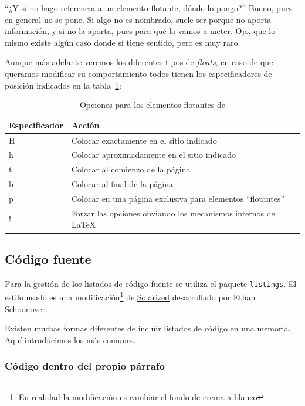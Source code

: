 \documentclass[%
    school=etsisi,%
    type=pfg,%
    degree=61CI,%
]{upm-report}
\begin{document}
\enquote{¿Y si no hago referencia a un elemento flotante, dónde lo pongo?} Bueno, pues en general no se pone. Si algo no es nombrado, suele ser porque no aporta información, y si no la aporta, pues para qué lo vamos a meter. Ojo, que lo mismo existe algún caso donde sí tiene sentido, pero es muy raro.

Aunque más adelante veremos los diferentes tipos de \textit{floats}, en caso de que queramos modificar su comportamiento todos tienen los especificadores de posición indicados en la tabla~\ref{tab:floats-options}:

\begin{table}
    \caption{\label{tab:floats-options}Opciones para los elementos flotantes de }
    \centering
    \begin{tabularx}{\textwidth}{@{}lX@{}}
        \toprule
        \textbf{Especificador} & \textbf{Acción} \\
        \midrule
        H & Colocar exactamente en el sitio indicado                       \\
        h & Colocar aproximadamente en el sitio indicado                   \\
        t & Colocar al comienzo de la página                               \\
        b & Colocar al final de la página                                  \\
        p & Colocar en una página exclusiva para elementos ``flotantes''   \\
        ! & Forzar las opciones obviando los mecanismos internos de \LaTeX \\
    \bottomrule
    \end{tabularx}
\end{table}

\subsection{Código fuente}

Para la gestión de los listados de código fuente se utiliza el paquete \texttt{listings}. El estilo usado es una modificación\footnote{En realidad la modificación es cambiar el fondo de crema a blanco} de \href{https://ethanschoonover.com/solarized/}{Solarized} desarrollado por Ethan Schoonover.

Existen muchas formas diferentes de incluir listados de código en una memoria. Aquí introducimos los más comunes.

\subsubsection{Código dentro del propio párrafo}
\end{document}
